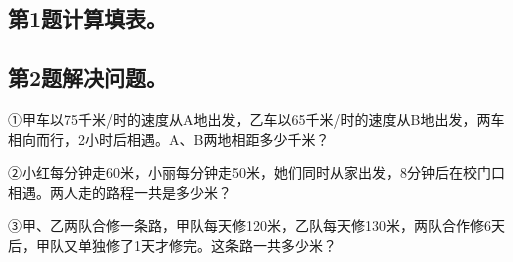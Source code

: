 \subsection*{第1题\quad 计算填表。}
\subsection*{第2题\quad 解决问题。}
\noindent ①甲车以75千米/时的速度从A地出发，乙车以65千米/时的速度从B地出发，两车相向而行，2小时后相遇。A、B两地相距多少千米？\par
{}
\noindent ②小红每分钟走60米，小丽每分钟走50米，她们同时从家出发，8分钟后在校门口相遇。两人走的路程一共是多少米？\par
{}
\noindent ③甲、乙两队合修一条路，甲队每天修120米，乙队每天修130米，两队合作修6天后，甲队又单独修了1天才修完。这条路一共多少米？\par
{}

